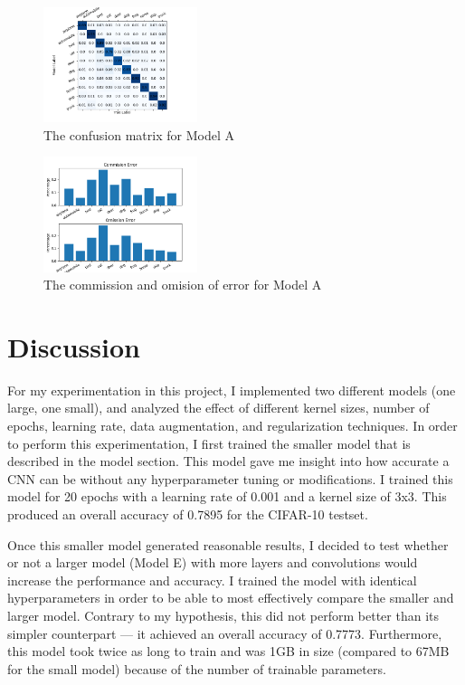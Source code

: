 \documentclass[11pt,a4paper]{article}
\begin{document}
\begin{figure}
  \centering
  \includegraphics[width=0.40\textwidth]{figures/confusion.png}
  \caption{The confusion matrix for Model A}
  \label{fig:confusion}
\end{figure}

\begin{figure}
  \centering
  \includegraphics[width=0.40\textwidth]{figures/commission_omision.png}
  \caption{The commission and omision of error for Model A}
  \label{fig:commission_omision}
\end{figure}



\section{Discussion}

For my experimentation in this project, I implemented two different models (one large, one small),
 and analyzed the effect of different kernel sizes, number of epochs, learning rate, data augmentation, and regularization techniques. 
 In order to perform this experimentation, I first trained the smaller model that is described in the model section. 
 This model gave me insight into how accurate a CNN can be without any hyperparameter tuning or modifications. 
 I trained this model for 20 epochs with a learning rate of 0.001 and a kernel size of 3x3. This produced an overall 
 accuracy of 0.7895 for the CIFAR-10 testset. 

Once this smaller model generated reasonable results, I decided to test whether or not a larger model (Model E) with 
 more layers and convolutions would increase the performance and accuracy. I trained the model with identical hyperparameters
  in order to be able to most effectively compare the smaller and larger model. Contrary to my hypothesis, this did not perform
   better than its simpler counterpart --- it achieved an overall accuracy of 0.7773. Furthermore, this model took twice as long
    to train and was 1GB in size (compared to 67MB for the small model) because of the number of trainable parameters. 
\end{document}
